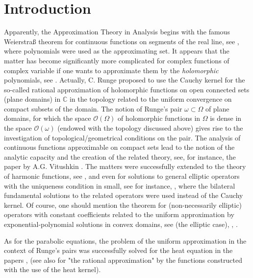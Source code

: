 \documentclass{amsart}
\theoremstyle{definition}
\theoremstyle{remark}
\numberwithin{equation}{section}
\begin{document}
\maketitle

\section*{Introduction}
\label{s.Int}



Apparently, the Approximation Theory in Analysis begins with the famous Weierstra\ss{} 
theorem for continuous functions on segments of the real line, see \cite{W1885}, 
where polynomials were used as the approximating set. It appears that the matter 
has become significantly more complicated for complex functions of complex variable if one 
wants to approximate  them by the \textit{holomorphic} polynomials, see \cite{R1885}. Actually,  
C. Runge \cite{R1885} proposed to use the Cauchy kernel for the so-called rational 
approximation of holomorphic functions on open connected sets (plane domains) 
in $\mathbb C$ in the topology related to the uniform convergence on compact subsets of the 
domain. The notion of Runge's pair $\omega \subset \Omega$ of plane domains, for which the 
space ${\mathcal O}(\Omega) $ of holomorphic functions  in $\Omega$ is dense in the space 
$ {\mathcal O}(\omega) $ (endowed with the topology discussed above) gives rise to the 
investigation of topological/geometrical conditions on the pair. The analysis of continuous 
functions approximable on  compact sets  lead to the notion of the analytic capacity and the 
creation of the related theory, see, for instance, the paper by A.G. Vitushkin \cite{V67}. 
The matters were successfully extended to the theory of harmonic functions, see 
\cite{Merg56}, and even for solutions to general elliptic operators with the uniqueness 
condition in small, see for instance, \cite[ch. 4, 5]{Tark37}, where the bilateral fundamental 
solutions to the related operators were used instead of the Cauchy kernel. Of course, one 
should mention the theorem for (non-necessarily elliptic) operators with constant coefficients 
related to the uniform approximation by exponential-polynomial solutions in convex domains, 
see \cite{Mal56} (the elliptic case), \cite{Mal63}, \cite[Ch. VI]{Pal}.

As for the parabolic equations, the problem of the uniform approximation in the context 
of Runge's pairs was successfully solved for the heat equation in the papers \cite{J}, 
\cite{D80}  (see also \cite{GauTa10} for "the rational approximation" by the functions 
constructed with the use of the heat kernel).
\end{document}
